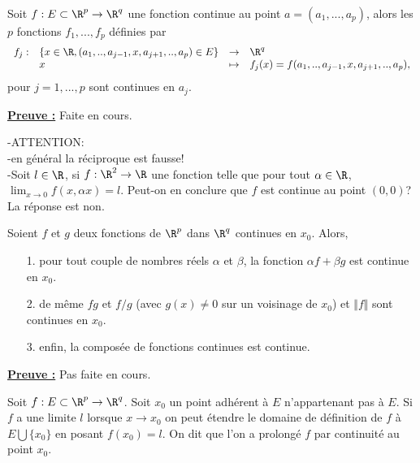 \documentclass[class=report,crop=false]{standalone}
\begin{document}
 \begin{proposition}
\textcolor[rgb]{0.50,0.00,0.25}{
Soit $f: E \subset \R^p \rightarrow \R^q$ une fonction continue au point $a=(a_1,...,a_p)$, alors les 
$p$ fonctions $f_1, ..., f_p$ définies par 
\begin{equation*}
\begin{array}{llll}
f_j:& \lbrace x\in \R, (a_1,.., a_{j-1},x,a_{j+1},..,a_p) \in E \rbrace & \rightarrow & \R^q \\
 & x & \mapsto & f_j(x)=f(a_1,.., a_{j-1},x,a_{j+1},..,a_p),
\end{array}
\end{equation*}
pour $j=1,...,p$ sont continues en $a_j$.
}
\end{proposition}

\noindent \underline{\bf Preuve :}
Faite en cours.



\begin{remarque*}
\textcolor[rgb]{0.00,0.00,1.00}{
\noindent 
-ATTENTION:\\
 -en général la réciproque est fausse!\\
-Soit $l \in \R$, si $f: \R^2 \rightarrow \R$ une fonction telle que pour tout $\alpha \in \R$,
$\displaystyle \lim_{x \rightarrow 0} f(x, \alpha x)=l$. Peut-on en conclure que $f$ 
est continue au point $(0,0)$? La réponse est non.
}
\end{remarque*}



\begin{theoreme}
\textcolor[rgb]{0.50,0.00,0.25}{
Soient $f$ et $g$  deux fonctions de $\R^p$ dans $\R^q$ continues en $x_0$. Alors,
\begin{itemize}
\item[1.] pour tout couple de nombres réels $\alpha$ et $\beta$, la fonction 
$\alpha f + \beta g$ est continue en $x_0$.
\item[2.] de même $fg$ et $f/g$ (avec $g(x) \neq 0$ sur un voisinage de $x_0$) et $\Vert f \Vert$ sont continues en $x_0$.
\item[3.] enfin, la composée de fonctions continues est continue.
\end{itemize}
}
\end{theoreme}

\noindent \underline{\bf Preuve :}
Pas faite en cours.



\begin{definition}
\textcolor[rgb]{0.73,0.00,0.00}{
\noindent Soit $f: E \subset \R^p \rightarrow \R^q$. Soit $x_0$ un point adhérent à $E$ 
n'appartenant pas à $E$. Si $f$ a une limite $l$ lorsque $x \rightarrow x_0$
on peut étendre le domaine de définition de $f$ à $E \bigcup \lbrace x_0 \rbrace$
en posant $f(x_0)=l$. On dit que l'on a prolongé $f$ par continuité au point $x_0$.
}
\end{definition}
\end{document}
